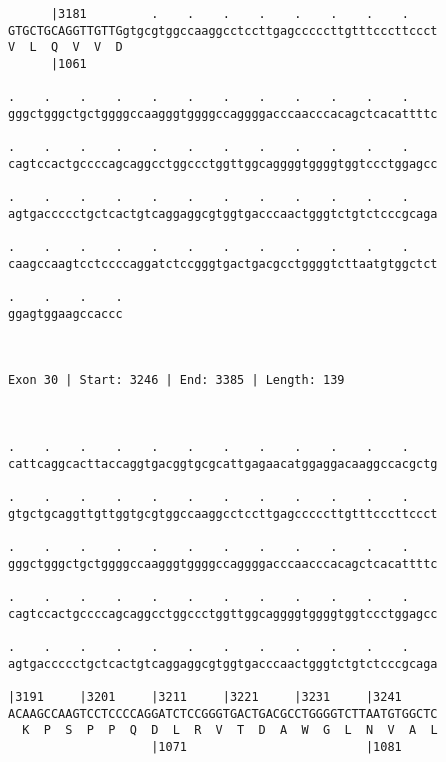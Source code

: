 \documentclass{article}
\begin{document}
\begin{Verbatim}
      |3181         .    .    .    .    .    .    .    .    
GTGCTGCAGGTTGTTGgtgcgtggccaaggcctccttgagcccccttgtttcccttccct
V  L  Q  V  V  D                                            
      |1061                                                 
  
.    .    .    .    .    .    .    .    .    .    .    .    
gggctgggctgctggggccaagggtggggccaggggacccaacccacagctcacattttc
                                                            
.    .    .    .    .    .    .    .    .    .    .    .    
cagtccactgccccagcaggcctggccctggttggcaggggtggggtggtccctggagcc
                                                            
.    .    .    .    .    .    .    .    .    .    .    .    
agtgaccccctgctcactgtcaggaggcgtggtgacccaactgggtctgtctcccgcaga
                                                            
.    .    .    .    .    .    .    .    .    .    .    .    
caagccaagtcctccccaggatctccgggtgactgacgcctggggtcttaatgtggctct
                                                            
.    .    .    .
ggagtggaagccaccc
                
                
 
Exon 30 | Start: 3246 | End: 3385 | Length: 139



.    .    .    .    .    .    .    .    .    .    .    .    
cattcaggcacttaccaggtgacggtgcgcattgagaacatggaggacaaggccacgctg
                                                            
.    .    .    .    .    .    .    .    .    .    .    .    
gtgctgcaggttgttggtgcgtggccaaggcctccttgagcccccttgtttcccttccct
                                                            
.    .    .    .    .    .    .    .    .    .    .    .    
gggctgggctgctggggccaagggtggggccaggggacccaacccacagctcacattttc
                                                            
.    .    .    .    .    .    .    .    .    .    .    .    
cagtccactgccccagcaggcctggccctggttggcaggggtggggtggtccctggagcc
                                                            
.    .    .    .    .    .    .    .    .    .    .    .    
agtgaccccctgctcactgtcaggaggcgtggtgacccaactgggtctgtctcccgcaga
                                                            
|3191     |3201     |3211     |3221     |3231     |3241     
ACAAGCCAAGTCCTCCCCAGGATCTCCGGGTGACTGACGCCTGGGGTCTTAATGTGGCTC
  K  P  S  P  P  Q  D  L  R  V  T  D  A  W  G  L  N  V  A  L
                    |1071                         |1081     
  

\end{Verbatim}
\end{document}
